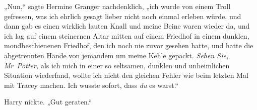 „Nun,“ sagte Hermine Granger nachdenklich, „ich wurde von einem Troll gefressen, was ich ehrlich gesagt lieber nicht noch einmal erleben würde, und dann gab es einen wirklich lauten Knall und meine Beine waren wieder da, und ich lag auf einem steinernen Altar mitten auf einem Friedhof in einem dunklen, mondbeschienenen Friedhof, den ich noch nie zuvor gesehen hatte, und hatte die abgetrennten Hände von jemandem um meine Kehle gepackt. \emph{Sehen Sie, Mr~Potter,} als ich mich in einer so seltsamen, dunklen und unheimlichen Situation wiederfand, wollte ich nicht den gleichen Fehler wie beim letzten Mal mit Tracey machen. Ich wusste sofort, dass \emph{du} es warst.“

Harry nickte. „Gut geraten.“

